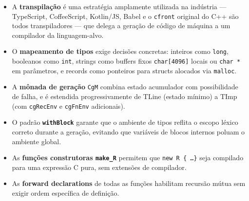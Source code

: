 \begin{itemize}
  \item A \textbf{transpilação} é uma estratégia amplamente utilizada na
    indústria — TypeScript, CoffeeScript, Kotlin/JS, Babel e o \texttt{cfront}
    original do C++ são todos transpiladores — que delega a geração de código
    de máquina a um compilador da linguagem-alvo.

  \item O \textbf{mapeamento de tipos} exige decisões concretas: inteiros como
    \texttt{long}, booleanos como \texttt{int}, strings como buffers fixos
    \texttt{char[4096]} locais ou \texttt{char *} em parâmetros, e records como
    ponteiros para structs alocados via \texttt{malloc}.

  \item A \textbf{mônada de geração} \texttt{CgM} combina estado acumulador
    com possibilidade de falha, e é estendida progressivamente de TLine (estado
    mínimo) a TImp (com \texttt{cgRecEnv} e \texttt{cgFnEnv} adicionais).

  \item O padrão \textbf{\texttt{withBlock}} garante que o ambiente de tipos
    reflita o escopo léxico correto durante a geração, evitando que variáveis
    de blocos internos poluam o ambiente global.

  \item As \textbf{funções construtoras \texttt{make\_R}} permitem que
    \texttt{new R \{ \ldots \}} seja compilado para uma expressão C pura,
    sem extensões de compilador.

  \item As \textbf{forward declarations} de todas as funções habilitam
    recursão mútua sem exigir ordem específica de definição.
\end{itemize}
